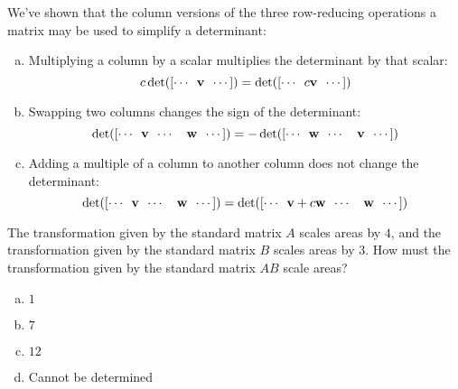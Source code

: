 \begin{applicationActivities}
\begin{remark}
\end{remark}




\begin{fact}
  We've shown that the column versions of the three row-reducing operations
  a matrix may be used to simplify a determinant:
  \begin{enumerate}[(a)]
  \item Multiplying a column by a scalar multiplies the
        determinant by that scalar:
        \[c\det([\cdots\hspace{0.5em}\vec{v}\hspace{0.5em} \cdots])=
        \det([\cdots\hspace{0.5em}c\vec{v}\hspace{0.5em} \cdots])\]
  \item Swapping two columns changes the sign of the determinant:
        \[\det([\cdots\hspace{0.5em}\vec{v}\hspace{0.5em}
        \cdots\hspace{1em}\vec{w}\hspace{0.5em} \cdots])=
        -\det([\cdots\hspace{0.5em}\vec{w}\hspace{0.5em}
        \cdots\hspace{1em}\vec{v}\hspace{0.5em} \cdots])\]
  \item Adding a multiple of a column to another column does not
        change the determinant:
        \[\det([\cdots\hspace{0.5em}\vec{v}\hspace{0.5em}
        \cdots\hspace{1em}\vec{w}\hspace{0.5em} \cdots])=
        \det([\cdots\hspace{0.5em}\vec{v}+c\vec{w}\hspace{0.5em}
        \cdots\hspace{1em}\vec{w}\hspace{0.5em} \cdots])\]
  \end{enumerate}
\end{fact}

\begin{activity}{5}
  The transformation given by the standard matrix \(A\) scales areas by
  \(4\), and the transformation given by the standard matrix \(B\) scales
  areas by \(3\). How must the transformation given by the standard matrix
  \(AB\) scale areas?
  \begin{enumerate}[(a)]
  \item \(1\)
  \item \(7\)
  \item \(12\)
  \item Cannot be determined
  \end{enumerate}


\end{activity}
\end{applicationActivities}

